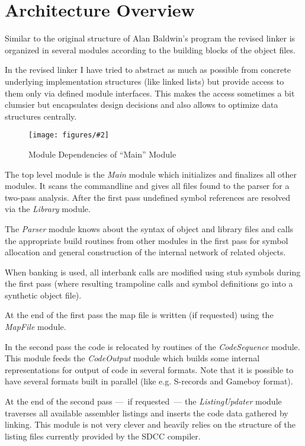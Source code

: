 \documentclass[10pt]{article}
\newcommand{\centeredExternalPicture}[2][]{%
  \begin{center}
    \texttt{[image: figures/\#2]}%
  \end{center}
}
\newcommand{\definition}[1]{\emph{#1}}
\newcommand{\generalDependencyFigure}[3]{%
  \begin{figure}[th]
    \centeredExternalPicture[width=\textwidth]{linkerFigures-#1.mps}
    \caption{#3}
    \label{#2}
  \end{figure}
}
\begin{document}
\section{Architecture Overview}

Similar to the original structure of Alan Baldwin's program the
revised linker is organized in several modules according to the
building blocks of the object files.

In the revised linker I have tried to abstract as much as possible
from concrete underlying implementation structures (like linked lists)
but provide access to them only via defined module interfaces.  This
makes the access sometimes a bit clumsier but encapsulates design
decisions and also allows to optimize data structures centrally.

\generalDependencyFigure{1}{figure:module_overview_main}
                           {Module Dependencies of ``Main'' Module}

The top level module is the \definition{Main} module which initializes
and finalizes all other modules.  It scans the commandline and gives
all files found to the parser for a two-pass analysis.  After the
first pass undefined symbol references are resolved via the
\definition{Library} module.

The \definition{Parser} module knows about the syntax of object and
library files and calls the appropriate build routines from other
modules in the first pass for symbol allocation and general
construction of the internal network of related objects.

When banking is used, all interbank calls are modified using stub
symbols during the first pass (where resulting trampoline calls and
symbol definitions go into a synthetic object file).

At the end of the first pass the map file is written (if requested)
using the \definition{MapFile} module.

In the second pass the code is relocated by routines of the
\definition{CodeSequence} module.  This module feeds the
\definition{CodeOutput} module which builds some internal
representations for output of code in several formats.  Note that it
is possible to have several formats built in parallel (like
e.g. S-records and Gameboy format).

At the end of the second pass ---~if requested~--- the
\definition{ListingUpdater} module traverses all available assembler
listings and inserts the code data gathered by linking.  This module
is not very clever and heavily relies on the structure of the listing
files currently provided by the SDCC compiler.
\end{document}

